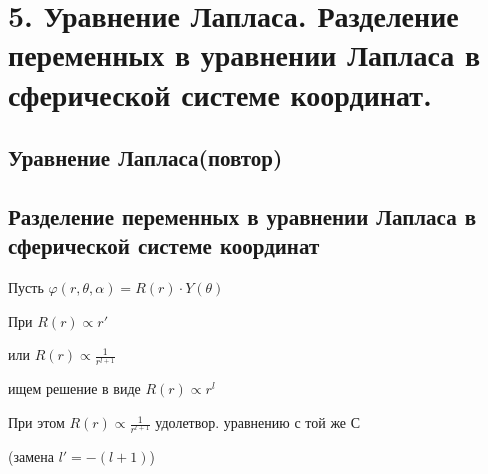 
\section*{5. Уравнение Лапласа. Разделение переменных в уравнении Лапласа в
сферической системе координат.}

\subsection*{Уравнение Лапласа(повтор)}

\subsection*{Разделение переменных в уравнении Лапласа в
сферической системе координат}

Пусть $\varphi(r,\theta,\alpha)=R(r)\cdot Y(\theta)$


При $R(r)\varpropto r'$

или $R(r)\varpropto \frac{1}{r^{l+1}}$


ищем решение в виде $R(r)\varpropto r^l$


При этом $R(r)\varpropto \frac{1}{r^{l+1}}$ удолетвор. уравнению с той же С 

(замена $l'=-(l+1)$) 
